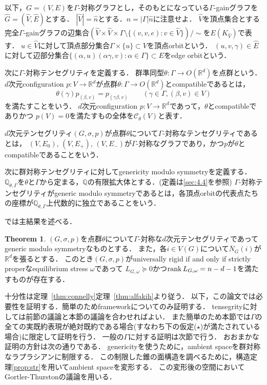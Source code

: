 \documentclass[11pt]{article}
\theoremstyle{definition}
\newtheorem{theorem}{Theorem}
\begin{document}
    以下，$G=(V,E)$を$\Gamma$-対称グラフとし，そのもとになっている$\Gamma$-gainグラフを$\hat{G}=(\hat{V},\hat{E})$とする．
    $|\hat{V}|=\hat{n}$とする．$n=|\Gamma|\hat{n}$に注意せよ．
    $\hat{V}$を頂点集合とする完全$\Gamma$-gainグラフの辺集合$(\hat{V} \times \hat{V} \times \Gamma \setminus \{ (v,v,e) : v \in \hat{V} \} )/\sim$を$E(K_{\hat{V}})$で表す．
    $u \in \hat{V}$に対して頂点部分集合$\Gamma \times \{u\} \subset V$を頂点orbitという．
    $(u,v,\gamma) \in \hat{E}$に対して辺部分集合$\{ (\alpha,u)(\alpha\gamma,v) : \alpha \in \Gamma\} \subset E$をedge orbitという．
    
    次に$\Gamma$-対称テンセグリティを定義する．
    群準同型$\theta:\Gamma \rightarrow O(\mathbb{R}^d)$を点群という．
    $d$次元configuration $p:V \rightarrow \mathbb{R}^d$が点群$\theta:\Gamma \rightarrow O(\mathbb{R}^d)$とcompatibleであるとは，
    \[
        \theta(\gamma) p_{(\beta,v)} = p_{(\gamma \beta,v)} \qquad (\gamma \in \Gamma, (\beta,v) \in V )
    \]
    を満たすことをいう．
    $d$次元configuration $p:V \rightarrow \mathbb{R}^d$であって，$\theta$とcompatibleでありかつ
    $p(V)=0$を満たすもの全体を$\mathcal{C}_\theta(V)$と表す．
    
    $d$次元テンセグリティ$(G,\sigma,p)$が点群$\theta$について$\Gamma$-対称なテンセグリティであるとは，
    $(V,E_0)$, $(V,E_+)$, $(V,E_-)$が$\Gamma$-対称なグラフであり，かつ$p$が$\theta$とcompatibleであることをいう．
    
    次に群対称テンセグリティに対してgenericity modulo symmetryを定義する．
    $\mathbb{Q}_{\theta,\Gamma}$を$\theta$と$\Gamma$から定まる，$\mathbb{Q}$の有限拡大体とする．(定義は\ref{sec:4.4}を参照)
    $\Gamma$-対称テンセグリティがgeneric modulo symmetryであるとは，各頂点orbitの代表点たちの座標が$\mathbb{Q}_{\theta,\Gamma}$上代数的に独立であることをいう．
    
    では主結果を述べる．
    \begin{theorem} \label{thm:sym}
        $(G,\sigma,p)$を点群$\theta$について$\Gamma$-対称な$d$次元テンセグリティであってgeneric modulo symmetryなものとする．
        また，各$i \in V(G)$について$\overline{N}_G(i)$が$\mathbb{R}^d$を張るとする．
        このとき$(G,\sigma,p)$がuniversally rigid if and only if strictly properなequilibrium stress $\omega$であって
        $L_{G,\omega} \succeq 0$かつ$\rank L_{G,\omega}=n-d-1$を満たすものが存在する．
    \end{theorem}
    
    十分性は定理~\ref{thm:connelly}定理~\ref{thm:alfakih}より従う．
    以下，この論文では必要性を証明する．簡単のためframeworkについてのみ証明する．
    tensegrityに対しては前節の議論と本節の議論を合わせればよい．
    また簡単のため本節では$\Gamma$の全ての実既約表現が絶対既約である場合(すなわち下の仮定($\star$)が満たされている場合)に限定して証明を行う．
    一般の$\Gamma$に対する証明は次節で行う．
    おおまかな証明の方針は次の通りである．
    genericityを使うために，ambient spaceを群対称なラプラシアンに制限する．
    この制限した錐の面構造を調べるために，構造定理\ref{prop:str}を用いてambient spaceを変形する．
    この変形後の空間においてGortler-Thurstonの議論を用いる．
    
\end{document}
